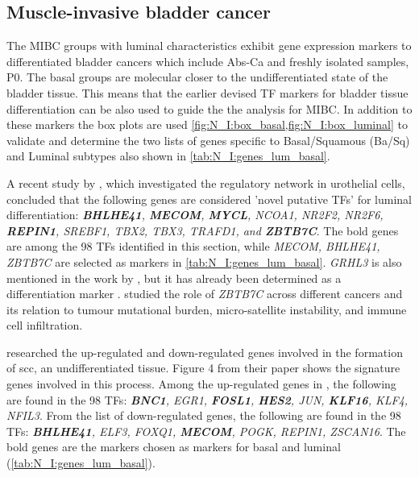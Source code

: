 \newpage

\subsection{Muscle-invasive bladder cancer} \label{s:N_I:sel_tfs_cancer}


The MIBC groups with luminal characteristics exhibit gene expression markers to differentiated bladder cancers which include Abs-Ca and freshly isolated samples, P0. The basal groups are molecular closer to the undifferentiated state of the bladder tissue. This means that the earlier devised TF markers for bladder tissue differentiation can be also used to guide the the analysis for MIBC. In addition to these markers the box plots are used \cref{fig:N_I:box_basal,fig:N_I:box_luminal} to validate and determine the two lists of genes specific to Basal/Squamous (Ba/Sq) and Luminal subtypes  also shown in \cref{tab:N_I:genes_lum_basal}. 

A recent study by \citet{Ramal2024-ha}, which investigated the regulatory network in urothelial cells, concluded that the following genes are considered 'novel putative TFs' for luminal differentiation: \textit{\textbf{BHLHE41}, \textbf{MECOM}, \textbf{MYCL}, NCOA1, NR2F2, NR2F6, \textbf{REPIN1}, SREBF1, TBX2, TBX3, TRAFD1, and \textbf{ZBTB7C}}. The bold genes are among the 98 TFs identified in this section, while \textit{MECOM, BHLHE41, ZBTB7C} are selected as markers in \cref{tab:N_I:genes_lum_basal}. \textit{GRHL3} is also mentioned in the work by \citet{Ramal2024-ha}, but it has already been determined as a differentiation marker \citet{Bock2014-zy}. \citet{Chen2021-tc} studied the role of \textit{ZBTB7C} across different cancers and its relation to tumour mutational burden, micro-satellite instability, and immune cell infiltration.

\citet{Hurst2022-sp} researched the up-regulated and down-regulated genes involved in the formation of \acrfull{scc}, an undifferentiated tissue. Figure 4 from their paper shows the signature genes involved in this process. Among the up-regulated genes in \citet{Hurst2022-sp}, the following are found in the 98 TFs: \textit{\textbf{BNC1}, EGR1, \textbf{FOSL1}, \textbf{HES2}, JUN, \textbf{KLF16}, KLF4, NFIL3}. From the list of down-regulated genes, the following are found in the 98 TFs: \textit{\textbf{BHLHE41}, ELF3, FOXQ1, \textbf{MECOM}, POGK, REPIN1, ZSCAN16}. The bold genes are the markers chosen as markers for basal and luminal (\cref{tab:N_I:genes_lum_basal}).


